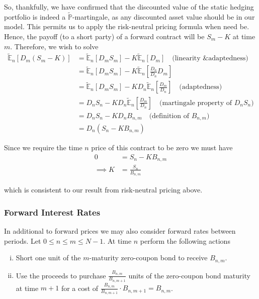 \documentclass[12pt]{article}
\newlength\tindent
\renewcommand{\indent}{\hspace*{\tindent}}
\renewcommand{\P}{\mathbb P}
\newcommand{\E}{\mathbb E}
\begin{document}
\indent So, thankfully, we have confirmed that the discounted value of the static hedging portfolio is indeed a $\tilde{\P}$-martingale, as any discounted asset value should be in our model. This permits us to apply the risk-neutral pricing formula when need be. Hence, the payoff (to a short party) of a forward contract will be $S_m - K$ at time $m$. Therefore, we wish to solve
\begin{align*}
	\tilde{\E}_n[D_m(S_m - K)] &= \tilde{\E}_n[D_mS_m] - K\tilde{\E}_n[D_m] \quad \text{(linearity \& adaptedness)} \\
	&= \tilde{\E}_n[D_mS_m] - K\tilde{\E}_n \left[ \frac{D_n}{D_n} D_m \right] \\
	&= \tilde{\E}_n[D_mS_m] - KD_n \tilde{\E}_n \left[ \frac{D_m}{D_n} \right] \quad \text{(adaptedness)} \\
	&= D_nS_n - KD_n \tilde{\E}_n \left[ \frac{D_m}{D_n} \right] \quad \text{(martingale property of $D_nS_n$)} \\
	&= D_nS_n - KD_nB_{n,m} \quad \text{(definition of $B_{n,m}$)} \\
	&= D_n \left( S_n - KB_{n,m} \right)
\end{align*}

Since we require the time $n$ price of this contract to be zero we must have
\begin{align*}
	0 &= S_n - KB_{n,m} \\
	\implies K &= \frac{ S_n }{ B_{n,m} }
\end{align*}

which is consistent to our result from risk-neutral pricing above. \\

\subsubsection{Forward Interest Rates}

\indent In additional to forward prices we may also consider forward rates between periods. Let $0 \leq n \leq m \leq N - 1$. At time $n$ perform the following actions
\begin{enumerate}[(i)]
	\item Short one unit of the $m$-maturity zero-coupon bond to receive $B_{n,m}$. 
	\item Use the proceeds to purchase $\frac{ B_{n,m} }{ B_{n, m + 1} }$ units of the zero-coupon bond maturity at time $m + 1$ for a cost of $\frac{ B_{n,m} }{ B_{n, m + 1} } \cdot B_{n, m + 1} = B_{n,m}$.
\end{enumerate}
\end{document}
